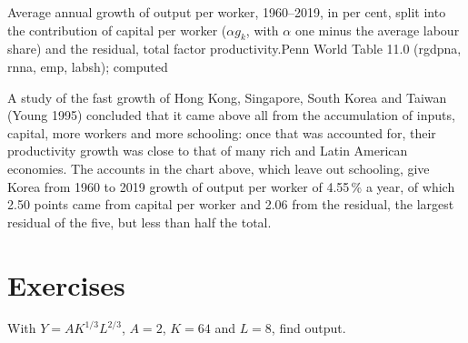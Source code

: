 \begin{omchart}{Average annual growth of output per worker, 1960--2019, in per cent, split into the contribution of capital per worker ($\alpha g_k$, with $\alpha$ one minus
the average labour share) and the residual, total factor productivity.}{Penn World Table 11.0 (rgdpna, rnna, emp, labsh); computed}
\end{omchart}

\begin{record}
A study of the fast growth of Hong Kong, Singapore, South Korea and Taiwan (Young 1995) concluded that it came above all from the
accumulation of inputs, capital, more workers and more schooling: once that was accounted for, their productivity growth was close to that of many rich and Latin American
economies. The accounts in the chart above, which leave out schooling, give Korea from 1960 to 2019 growth of output per worker of 4.55\,\% a year, of which 2.50 points came
from capital per worker and 2.06 from the residual, the largest residual of the five, but less than half the total.
\end{record}

\section{Exercises}

\begin{exercise}[$\star$]\label{exo:g12:growth-and-production-function:1}
With $Y = AK^{1/3}L^{2/3}$, $A = 2$, $K = 64$ and $L = 8$, find output.
\end{exercise}

